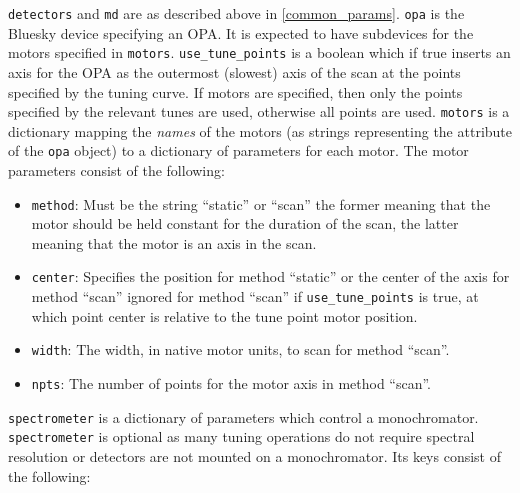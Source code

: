 \texttt{detectors} and \texttt{md} are as described above in \ref{common_params}.
\texttt{opa} is the Bluesky device specifying an OPA.
It is expected to have subdevices for the motors specified in \texttt{motors}.
\texttt{use\_tune\_points} is a boolean which if true inserts an axis for the OPA as the outermost (slowest) axis of the scan at the points specified by the tuning curve.
If motors are specified, then only the points specified by the relevant tunes are used, otherwise all points are used.
\texttt{motors} is a dictionary mapping the \textit{names} of the motors (as strings representing the attribute of the \texttt{opa} object) to a dictionary of parameters for each motor.
The motor parameters consist of the following:
\begin{itemize}
	\item \texttt{method}: Must be the string ``static'' or ``scan'' the former meaning that the motor should be held constant for the duration of the scan, the latter meaning that the motor is an axis in the scan.
	\item \texttt{center}: Specifies the position for method ``static'' or the center of the axis for method ``scan'' ignored for method ``scan'' if \texttt{use\_tune\_points} is true, at which point center is relative to the tune point motor position.
	\item \texttt{width}: The width, in native motor units, to scan for method ``scan''.
	\item \texttt{npts}: The number of points for the motor axis in method ``scan''.
\end{itemize}
\texttt{spectrometer} is a dictionary of parameters which control a monochromator.
\texttt{spectrometer} is optional as many tuning operations do not require spectral resolution or detectors are not mounted on a monochromator.
Its keys consist of the following:
